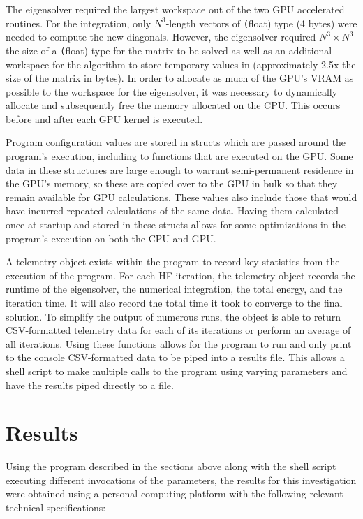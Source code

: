 \documentclass[conference, twoside]{IEEEtran}
\begin{document}
The eigensolver required the largest workspace out of the two GPU accelerated routines. For the integration, only $N^3$-length vectors of \texttt(float) type (4 bytes) were needed to compute the new diagonals. However, the eigensolver required $N^3 \times N^3$ the size of a \texttt(float) type for the matrix to be solved as well as an additional workspace for the algorithm to store temporary values in (approximately 2.5x the size of the matrix in bytes). In order to allocate as much of the GPU's VRAM as possible to the workspace for the eigensolver, it was necessary to dynamically allocate and subsequently free the memory allocated on the CPU. This occurs before and after each GPU kernel is executed.

Program configuration values are stored in structs which are passed around the program's execution, including to functions that are executed on the GPU. Some data in these structures are large enough to warrant semi-permanent residence in the GPU's memory, so these are copied over to the GPU in bulk so that they remain available for GPU calculations. These values also include those that would have incurred repeated calculations of the same data. Having them calculated once at startup and stored in these structs allows for some optimizations in the program's execution on both the CPU and GPU.

A telemetry object exists within the program to record key statistics from the execution of the program. For each HF iteration, the telemetry object records the runtime of the eigensolver, the numerical integration, the total energy, and the iteration time. It will also record the total time it took to converge to the final solution. To simplify the output of numerous runs, the object is able to return CSV-formatted telemetry data for each of its iterations or perform an average of all iterations. Using these functions allows for the program to run and only print to the console CSV-formatted data to be piped into a results file. This allows a shell script to make multiple calls to the program using varying parameters and have the results piped directly to a file.

\section{Results} %

Using the program described in the sections above along with the shell script executing different invocations of the parameters, the results for this investigation were obtained using a personal computing platform with the following relevant technical specifications:
\end{document}
